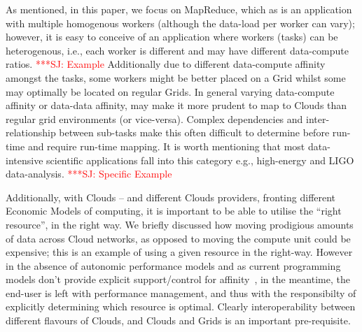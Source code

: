 \documentclass[conference,final]{IEEEtran}
\newcommand{\jhanote}[1]{ {\textcolor{red} { ***SJ: #1 }}}
\newcommand{\jhanote}[1]{}
\begin{document}

As mentioned, in this paper, we focus on MapReduce, which as is an
application with multiple homogenous workers (although the data-load
per worker can vary); however, it is easy to conceive of an
application where workers (tasks) can be heterogenous, i.e., each
worker is different and may have different data-compute ratios.
\jhanote{Example} Additionally due to different data-compute affinity
amongst the tasks, some workers might be better placed on a Grid
whilst some may optimally be located on regular Grids.  In general
varying data-compute affinity or data-data affinity, may make it more
prudent to map to Clouds than regular grid environments (or
vice-versa).  Complex dependencies and inter-relationship between
sub-tasks make this often difficult to determine before run-time and
require run-time mapping. It is worth mentioning that most
data-intensive scientific applications fall into this category e.g.,
high-energy and LIGO data-analysis.  \jhanote{Specific Example}

Additionally, with Clouds -- and different Clouds providers, fronting
different Economic Models of computing, it is important to be able to
utilise the ``right resource'', in the right way. We briefly discussed
how moving prodigious amounts of data across Cloud networks, as
opposed to moving the compute unit could be expensive; this is an
example of using a given resource in the right-way. However in the
absence of autonomic performance models and as current programming
models don't provide explicit support/control for
affinity~\cite{jha_ccpe09}, in the meantime, the end-user is left with
performance management, and thus with the responsibilty of explicitly
determining which resource is optimal. Clearly interoperability
between different flavours of Clouds, and Clouds and Grids is an
important pre-requisite.

\end{document}
